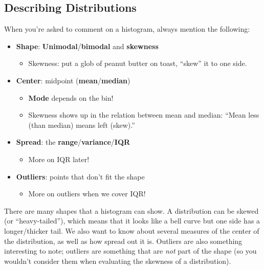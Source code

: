 \documentclass[
  letterpaper,
  DIV=11,
  numbers=noendperiod,
  oneside]{scrreprt}
\providecommand{\tightlist}{%
  \setlength{\itemsep}{0pt}\setlength{\parskip}{0pt}}\usepackage{longtable,booktabs,array}
\begin{document}
\hypertarget{describing-distributions}{%
\subsection{Describing Distributions}\label{describing-distributions}}

When you're asked to comment on a histogram, always mention the
following:

\begin{itemize}
\tightlist
\item
  \textbf{Shape}: \textbf{Unimodal}/\textbf{bimodal} and
  \textbf{skewness}

  \begin{itemize}
  \tightlist
  \item
    Skewness: put a glob of peanut butter on toast, ``skew'' it to one
    side.
  \end{itemize}
\item
  \textbf{Center}: midpoint (\textbf{mean}/\textbf{median})

  \begin{itemize}
  \tightlist
  \item
    \textbf{Mode} depends on the bin!
  \item
    Skewness shows up in the relation between mean and median: ``Mean
    less (than median) means left (skew).''
  \end{itemize}
\item
  \textbf{Spread}: the \textbf{range}/\textbf{variance}/\textbf{IQR}

  \begin{itemize}
  \tightlist
  \item
    More on IQR later!
  \end{itemize}
\item
  \textbf{Outliers}: points that don't fit the shape

  \begin{itemize}
  \tightlist
  \item
    More on outliers when we cover IQR!
  \end{itemize}
\end{itemize}

There are many shapes that a histogram can show. A distribution can be
skewed (or ``heavy-tailed''), which means that it looks like a bell
curve but one side has a longer/thicker tail. We also want to know about
several measures of the center of the distribution, as well as how
spread out it is. Outliers are also something interesting to note;
outliers are something that are \emph{not} part of the shape (so you
wouldn't consider them when evaluating the skewness of a distribution).
\end{document}
